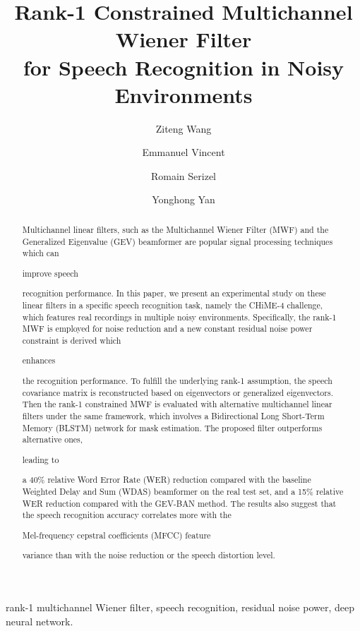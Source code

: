 \documentclass[review]{elsarticle}
\newif\ifproofread
\newcommand{\pfmarker}[1]{%
\ifproofread
\textcolor{red}{#1}%
\else
#1%
\fi
}
\newif\ifminorR
\newcommand{\pfminor}[1]{%
\ifminorR
\textcolor{red}{#1}%
\else
#1%
\fi
}
\begin{document}
\begin{frontmatter}

\title{Rank-1 Constrained Multichannel Wiener Filter\\ for Speech Recognition in Noisy Environments}


\author[mymainaddress]{Ziteng Wang}

\author[mysecondaryaddress]{Emmanuel Vincent}
\author[mythirdaddress]{Romain Serizel}
\author[mymainaddress]{Yonghong Yan}

\address[mymainaddress]{University of Chinese Academy of Sciences, Beijing, 100190, China}
\address[mysecondaryaddress]{Inria, F-54600, Villers-l{\`e}s-Nancy, France}
\address[mythirdaddress]{Universit\'e de Lorraine, LORIA, UMR 7503, Vand{\oe}uvre-l\`es-Nancy, F-54506, France}

\begin{abstract}
Multichannel linear filters, such as the Multichannel Wiener Filter (MWF) and the Generalized Eigenvalue (GEV) beamformer are popular signal processing techniques which can \pfmarker{improve speech} recognition performance. In this paper, we present an experimental study on these linear filters in a specific speech recognition task, namely the CHiME-4 challenge, which features real recordings in multiple noisy environments. Specifically, the rank-1 MWF is employed for noise reduction and a new constant residual noise power constraint is derived which \pfmarker{enhances} the recognition performance. To fulfill the underlying rank-1 assumption, the speech covariance matrix is reconstructed based on eigenvectors or generalized eigenvectors. Then the rank-1 constrained MWF is evaluated with alternative multichannel linear filters under the same framework, which involves a Bidirectional Long Short-Term Memory (BLSTM) network for mask estimation. The proposed filter outperforms alternative ones, \pfminor{leading to} a 40\% relative Word Error Rate (WER) reduction compared with the baseline Weighted Delay and Sum (WDAS) beamformer on the real test set, and a 15\% relative WER reduction compared with the GEV-BAN method. The results also suggest that the speech recognition accuracy correlates more with the \pfmarker{Mel-frequency cepstral coefficients (MFCC) feature} variance than with the noise reduction or the speech distortion level.
\end{abstract}

\begin{keyword}
rank-1 multichannel Wiener filter, speech recognition, residual noise power, deep neural network.
\end{keyword}

\end{frontmatter}
\end{document}
